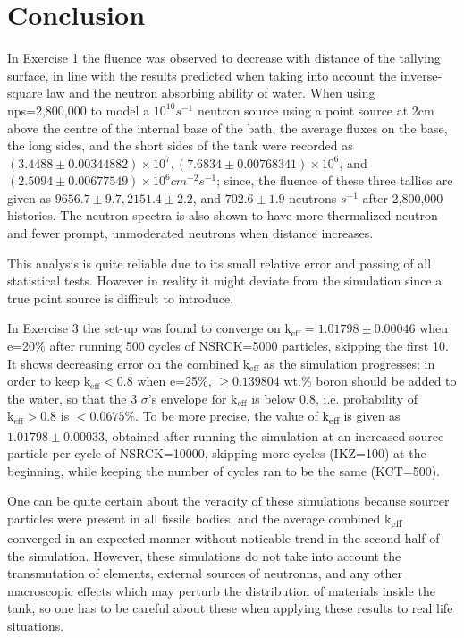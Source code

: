 \documentclass[a4paper, 11pt]{article}
\begin{document}
\section{Conclusion}
In Exercise 1 the fluence was observed to decrease with distance of the tallying surface, in line with the results predicted when taking into account the inverse-square law and the neutron absorbing ability of water. When using nps=2,800,000 to model a $10^{10} s^{-1}$ neutron source using a point source at 2cm above the centre of the internal base of the bath, the average fluxes on the base, the long sides, and the short sides of the tank were recorded as $(3.4488\pm0.00344882) \times 10^{7}, (7.6834 \pm 0.00768341)\times 10^{6}$, and $ (2.5094 \pm 0.00677549) \times 10^{6} cm^{-2} s^{-1}$; since, the fluence of these three tallies are given as $9656.7 \pm9.7  , 2151.4\pm2.2$, and $702.6\pm1.9$ neutrons $s^{-1}$ after 2,800,000 histories. The neutron spectra is also shown to have more thermalized neutron and fewer prompt, unmoderated neutrons when distance increases.

This analysis is quite reliable due to its small relative error and passing of all statistical tests. However in reality it might deviate from the simulation since a true point source is difficult to introduce.

In Exercise 3 the set-up was found to converge on $\text{k}_{\text{eff}} = 1.01798 \pm 0.00046$ when e=20\% after running 500 cycles of NSRCK=5000 particles, skipping the first 10. It shows decreasing error on the combined $\text{k}_{\text{eff}}$ as the simulation progresses; in order to keep $\text{k}_{\text{eff}} <0.8$ when e=25\%, $\ge 0.139804$ wt.\% boron should be added to the water, so that the 3 $\sigma$'s envelope for $\text{k}_{\text{eff}}$ is below 0.8, i.e. probability of $\text{k}_{\text{eff}}>0.8 $ is $ < 0.0675\% $. To be more precise, the value of k\textsubscript{eff} is given as $1.01798 \pm 0.00033$, obtained after running the simulation at an increased source particle per cycle of NSRCK=10000, skipping more cycles (IKZ=100) at the beginning, while keeping the number of cycles ran to be the same (KCT=500).

One can be quite certain about the veracity of these simulations because sourcer particles were present in all fissile bodies, and the average combined k\textsubscript{eff} converged in an expected manner without noticable trend in the second half of the simulation. However, these simulations do not take into account the transmutation of elements, external sources of neutronns, and any other macroscopic effects which may perturb the distribution of materials inside the tank, so one has to be careful about these when applying these results to real life situations.
\end{document}
